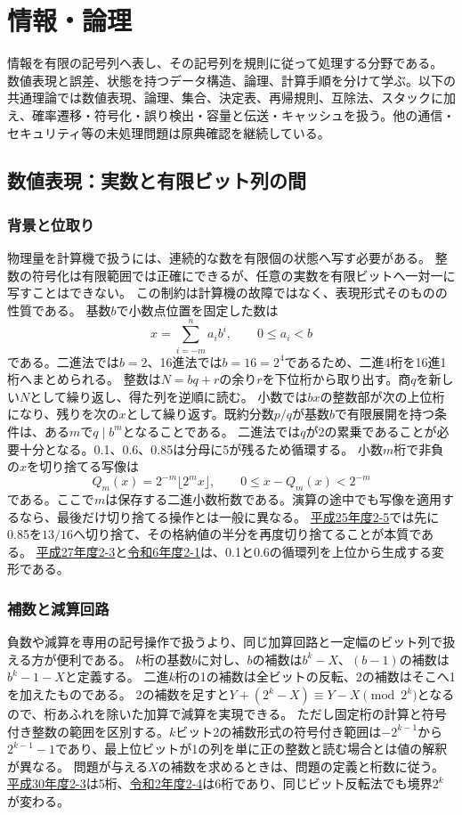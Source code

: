 \chapter{情報・論理}
\noindent 情報を有限の記号列へ表し、その記号列を規則に従って処理する分野である。
数値表現と誤差、状態を持つデータ構造、論理、計算手順を分けて学ぶ。以下の共通理論では数値表現、論理、集合、決定表、再帰規則、互除法、スタックに加え、確率遷移・符号化・誤り検出・容量と伝送・キャッシュを扱う。他の通信・セキュリティ等の未処理問題は原典確認を継続している。
\section{数値表現：実数と有限ビット列の間}
\subsection{背景と位取り}\label{theory:information:radix}
物理量を計算機で扱うには、連続的な数を有限個の状態へ写す必要がある。
整数の符号化は有限範囲では正確にできるが、任意の実数を有限ビットへ一対一に写すことはできない。
この制約は計算機の故障ではなく、表現形式そのものの性質である。
基数$b$で小数点位置を固定した数は
\[
 x=\sum_{i=-m}^{n}a_i b^i,\qquad 0\le a_i<b
\]
である。二進法では$b=2$、16進法では$b=16=2^4$であるため、二進4桁を16進1桁へまとめられる。
整数は$N=bq+r$の余り$r$を下位桁から取り出す。商$q$を新しい$N$として繰り返し、得た列を逆順に読む。
小数では$bx$の整数部が次の上位桁になり、残りを次の$x$として繰り返す。既約分数$p/q$が基数$b$で有限展開を持つ条件は、ある$m$で$q\mid b^m$となることである。
二進法では$q$が2の累乗であることが必要十分となる。0.1、0.6、0.85は分母に5が残るため循環する。
小数$m$桁で非負の$x$を切り捨てる写像は
\[
 Q_m(x)=2^{-m}\lfloor2^m x\rfloor,
 \qquad 0\le x-Q_m(x)<2^{-m}
\]
である。ここで$m$は保存する二進小数桁数である。演算の途中でも写像を適用するなら、最後だけ切り捨てる操作とは一般に異なる。
\hyperref[q:h25-reg-basic-2-5]{平成25年度2-5}では先に0.85を$13/16$へ切り捨て、その格納値の半分を再度切り捨てることが本質である。
\hyperref[q:h27-reg-basic-2-3]{平成27年度2-3}と\hyperref[q:r06-reg-basic-2-1]{令和6年度2-1}は、0.1と0.6の循環列を上位から生成する変形である。

\subsection{補数と減算回路}\label{theory:information:complement}
負数や減算を専用の記号操作で扱うより、同じ加算回路と一定幅のビット列で扱える方が便利である。
$k$桁の基数$b$に対し、$b$の補数は$b^k-X$、$(b-1)$の補数は$b^k-1-X$と定義する。
二進$k$桁の1の補数は全ビットの反転、2の補数はそこへ1を加えたものである。
2の補数を足すと$Y+(2^k-X)\equiv Y-X\pmod{2^k}$となるので、桁あふれを除いた加算で減算を実現できる。
ただし固定桁の計算と符号付き整数の範囲を区別する。$k$ビット2の補数形式の符号付き範囲は$-2^{k-1}$から$2^{k-1}-1$であり、最上位ビットが1の列を単に正の整数と読む場合とは値の解釈が異なる。
問題が与える$X$の補数を求めるときは、問題の定義と桁数に従う。
\hyperref[q:h30-reg-basic-2-3]{平成30年度2-3}は5桁、\hyperref[q:r02-reg-basic-2-4]{令和2年度2-4}は6桁であり、同じビット反転法でも境界$2^k$が変わる。

